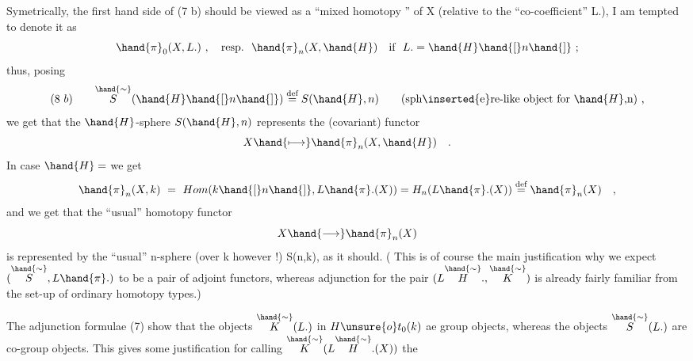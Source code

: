 Symetrically, the first hand side of (7 b) should be viewed as
a ``mixed homotopy '' of X (relative to the ``co-coefficient'' L.),
I am tempted to denote it  as
\[
\hand{\pi}_{0}(X,L.)\ ,\quad\text{resp.}\ \ \hand{\pi}_{n}(X,\hand{H})\quad\text{if}\ \ L. =\hand{H}\hand{[}n\hand{]}\ ;
\]
thus, posing
\[
(8\ b)\qquad \overset{\hand{\sim}}{S}(\hand{H}\hand{[}n\hand{]}) \overset{\text{def}}{=} S(\hand{H},n) \qquad \text{(sph\inserted{e}re-like object for $\hand{H}$,n) ,}
\]
we get that the $\hand{H}$-sphere $S(\hand{H},n)$  represents the (covariant) functor 
\[
X \hand{\longmapsto} \hand{\pi}_{n}(X,\hand{H}) \quad .
\]
In case $\hand{H}=$\hand{,} we get
\[
\hand{\pi}_{n}(X,k) \ = \ Hom(k\hand{[}n\hand{]},L\hand{\pi}.(X)) = H_{n}(L\hand{\pi}.(X)) \overset{\text{def}}{=} \hand{\pi}_{n}(X) \quad ,
\]
and we get that the  ``usual'' homotopy  functor
\[
X \hand{\longrightarrow} \hand{\pi}_{n}(X)
\]
is represented by the ``usual'' n-sphere (over k however !) S(n,k), as
it should. ( This is of course the main justification why we expect
$(\overset{\hand{\sim}}{S},L\hand{\pi}.)$ to be a pair of adjoint functors, whereas adjunction for the
pair $(L\overset{\hand{\sim}}{H}.,\overset{\hand{\sim}}{K})$ is already fairly familiar from the set-up of ordinary
homotopy types.)

The adjunction formulae (7) show that the objects $\overset{\hand{\sim}}{K}(L.)$
in $H\unsure{o}t_{0}(k)$ ae group objects, whereas the objects $\overset{\hand{\sim}}{S}(L.)$ are co-group
objects. This gives some  justification for calling  $\overset{\hand{\sim}}{K}(L\overset{\hand{\sim}}{H}.(X))$ the

